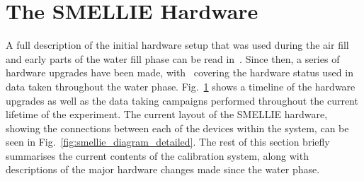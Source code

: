 \section{The SMELLIE Hardware}\label{sec:smellie_hardware}
A full description of the initial hardware setup that was used during the air fill and early parts of the water fill phase can be read in~\cite{}. %
Since then, a series of hardware upgrades have been made, with~\cite{} %
covering the hardware status used in data taken throughout the water phase.
Fig.~\ref{fig:smellie_timeline} shows a timeline of the hardware upgrades as well as the data taking campaigns performed throughout the current lifetime of the experiment. The current layout of the SMELLIE hardware, showing the connections between each of the devices within the system, can be seen in Fig.~\ref{fig:smellie_diagram_detailed}. The rest of this section briefly summarises the current contents of the calibration system, along with descriptions of the major hardware changes made since the water phase.

\begin{figure}
    \centering
    \caption[]{}
    \label{fig:smellie_timeline}
\end{figure}

